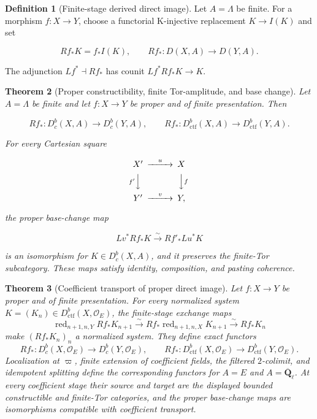 \documentclass[10pt]{article}
\newtheorem{theorem}{Theorem}[section]
\theoremstyle{definition}
\newtheorem{definition}[theorem]{Definition}
\newcommand{\Qlb}{\overline{\mathbf Q}_\ell}
\newcommand{\OO}{\mathcal O}
\newcommand{\Dbc}{D^b_c}
\newcommand{\Dctf}{D^b_{\mathrm{ctf}}}
\newcommand{\red}{\operatorname{red}}
\begin{document}
\begin{definition}[Finite-stage derived direct image]
Let \(A=\Lambda\) be finite.  For a morphism \(f:X\to Y\), choose a
functorial K-injective replacement \(K\to I(K)\) and set

\[
 Rf_*K=f_*I(K),\qquad
 Rf_*:D(X,A)\longrightarrow D(Y,A).
\]

The adjunction \(Lf^*\dashv Rf_*\) has counit
\(Lf^*Rf_*K\to K\).
\end{definition}

\begin{theorem}[Proper constructibility, finite Tor-amplitude, and base change]
Let \(A=\Lambda\) be finite and let \(f:X\to Y\) be proper and of finite
presentation.  Then

\[
 Rf_*:\Dbc(X,A)\longrightarrow\Dbc(Y,A),
 \qquad
 Rf_*:\Dctf(X,A)\longrightarrow\Dctf(Y,A).
\]

For every Cartesian square

\[
\begin{CD}
X' @>{u}>> X\\
@V{f'}VV @VV{f}V\\
Y' @>{v}>> Y,
\end{CD}
\]

the proper base-change map

\[
 Lv^*Rf_*K\xrightarrow{\sim}Rf'_*Lu^*K
\]

is an isomorphism for \(K\in\Dbc(X,A)\), and it preserves the finite-Tor
subcategory.  These maps satisfy identity, composition, and pasting
coherence.
\end{theorem}

\begin{theorem}[Coefficient transport of proper direct image]
Let \(f:X\to Y\) be proper and of finite presentation.  For every normalized
system \(K=(K_n)\in\Dctf(X,\OO_E)\), the finite-stage exchange maps
\[
 \red_{n+1,n,Y}Rf_*K_{n+1}\xrightarrow{\sim}
 Rf_*\red_{n+1,n,X}K_{n+1}\xrightarrow{\sim}Rf_*K_n
\]
make \((Rf_*K_n)_n\) a normalized system.  They define exact functors
\[
 Rf_*:\Dbc(X,\OO_E)\longrightarrow\Dbc(Y,\OO_E),
 \qquad
 Rf_*:\Dctf(X,\OO_E)\longrightarrow\Dctf(Y,\OO_E).
\]
Localization at \(\varpi\), finite extension of coefficient fields, the
filtered \(2\)-colimit, and idempotent splitting define the corresponding
functors for \(A=E\) and \(A=\Qlb\).  At every coefficient stage their source
and target are the displayed bounded constructible and finite-Tor categories,
and the proper base-change maps are isomorphisms compatible with coefficient
transport.
\end{theorem}
\end{document}
